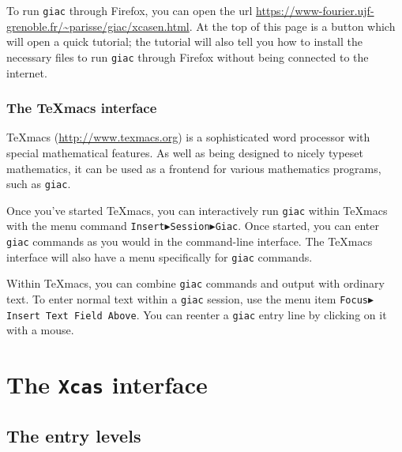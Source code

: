 \documentclass[a4paper,11pt]{book}
\begin{document}

To run \texttt{giac} through Firefox, you can open the url
\url{https://www-fourier.ujf-grenoble.fr/~parisse/giac/xcasen.html}.
At the top of this page is a button which will open a quick tutorial;
the tutorial will also tell you how to install the necessary files to
run \texttt{giac} through Firefox without being connected to the
internet.

\subsection{The TeXmacs interface}

TeXmacs (\url{http://www.texmacs.org}) is a sophisticated word
processor with special mathematical features.  As well as being
designed to nicely typeset mathematics, it can be used as a frontend
for various mathematics programs, such as \texttt{giac}.

Once you've started TeXmacs, you can interactively run \texttt{giac}
within TeXmacs with the menu command
\texttt{Insert$\blacktriangleright$Session$\blacktriangleright$Giac}.
Once started, you can enter \texttt{giac} commands as you would in the
command-line interface.  The TeXmacs interface will also have a menu
specifically for \texttt{giac} commands.

Within TeXmacs, you can combine \texttt{giac} commands and output with
ordinary text.  To enter normal text within a \texttt{giac} session,
use the menu item \texttt{Focus$\blacktriangleright$Insert Text Field
Above}.  You can reenter a \texttt{giac} entry line by clicking on it
with a mouse.



\chapter{The \texttt{Xcas} interface}

\section{The entry levels}
\end{document}
